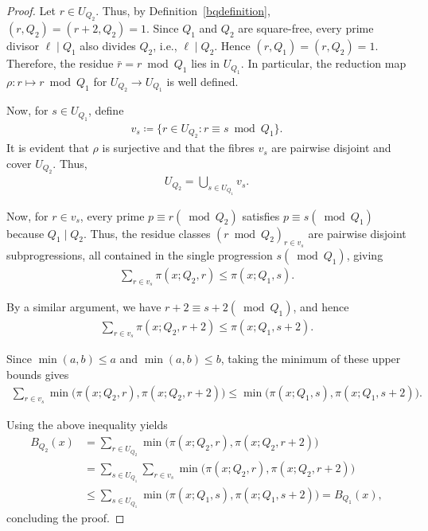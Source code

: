 \documentclass[11pt,reqno]{amsart}
\theoremstyle{plain}\newtheorem{theorem}{Theorem}[section]
\numberwithin{equation}{section}
\begin{document}
\begin{proof}
Let $r \in U_{Q_2}$. Thus, by Definition~\ref{bqdefinition}, $(r,Q_2) = (r+2,Q_2) = 1$. Since $Q_1$ and $Q_2$ are square-free, every prime divisor $\ell\mid Q_1$ also divides $Q_2$, i.e., $\ell \mid Q_2$. Hence $(r,Q_1) = (r,Q_2) = 1$. Therefore, the residue $\bar{r}=r\bmod{Q_1}$ lies in $U_{Q_1}$. In particular, the reduction map $\rho: r\mapsto r\bmod{Q_1}$ for $U_{Q_2}\to U_{Q_1}$ is well defined.

\medskip
Now, for $s \in U_{Q_1}$, define
\begin{align*}
v_s
\coloneqq \{r \in U_{Q_2} : r \equiv s \bmod{Q_1}\}.
\end{align*}
It is evident that $\rho$ is surjective and that the fibres $v_s$ are pairwise disjoint and cover $U_{Q_2}$. Thus,
\begin{align*}
U_{Q_2}
= \bigcup_{s \in U_{Q_1}} v_s .
\end{align*}

\noindent
Now, for $r \in v_s$, every prime $p \equiv r(\bmod{Q_2})$ satisfies $p \equiv s(\bmod{Q_1})$ because $Q_1 \mid Q_2$. Thus, the residue classes $(r \bmod{Q_2})_{r \in v_s}$ are pairwise disjoint subprogressions, all contained in the single progression $s(\bmod{Q_1})$, giving
\begin{align*}
\sum_{r \in v_s} \pi(x;Q_2,r)
\leq \pi(x;Q_1,s).
\end{align*}

\noindent
By a similar argument, we have $r+2 \equiv s+2(\bmod{Q_1})$, and hence
\begin{align*}
\sum_{r \in v_s} \pi(x;Q_2,r+2)
\leq \pi(x;Q_1,s+2).
\end{align*}

\noindent
Since $\min(a,b) \leq a$ and $\min(a,b) \leq b$, taking the minimum of these upper bounds gives
\begin{align*}
\sum_{r \in v_s} \min \bigl(\pi(x;Q_2,r),\pi(x;Q_2,r+2)\bigr)
\leq \min\bigl(\pi(x;Q_1,s),\pi(x;Q_1,s+2)\bigr).
\end{align*}

\noindent
Using the above inequality yields
\begin{align*}
B_{Q_2}(x)
&= \sum_{r \in U_{Q_2}} \min\bigl(\pi(x;Q_2,r),\pi(x;Q_2,r+2)\bigr) \\
&= \sum_{s \in U_{Q_1}} \sum_{r \in v_s} \min\bigl(\pi(x;Q_2,r),\pi(x;Q_2,r+2)\bigr) \\
&\leq \sum_{s \in U_{Q_1}} \min\bigl(\pi(x;Q_1,s),\pi(x;Q_1,s+2)\bigr)
=B_{Q_1}(x),
\end{align*}
concluding the proof.
\end{proof}
\end{document}
